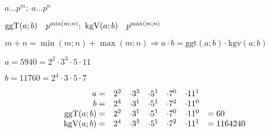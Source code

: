 $a \dots p^m;\ a \dots p^n$

$\ggt(a;b)\quad p^{\min(m;n)};\ \kgv(a;b)\quad p^{\max(m;n)}$

$m + n = \min(m;n) + \max(m;n) \Rightarrow a \cdot b = \textrm{ggt}(a;b) \cdot \textrm{kgv}(a;b)$

$a = 5940 = 2^2 \cdot 3^3 \cdot 5 \cdot 11$

$b = 11760 = 2^4 \cdot 3 \cdot 5 \cdot 7$

$$\begin{array}{rcccccl}
        a = & 2^2 & \cdot 3^3 & \cdot 5^1 & \cdot 7^0 & \cdot 11^1 \\
        b = & 2^4 & \cdot 3^1 & \cdot 5^1 & \cdot 7^2 & \cdot 11^0 \\
        \operatorname{ggT}(a;b) = & 2^2 & \cdot 3^1 & \cdot 5^1 & \cdot 7^0 & \cdot 11^0 & = 60      \\
        \operatorname{kgV}(a;b) = & 2^4 & \cdot 3^3 & \cdot 5^1 & \cdot 7^2 & \cdot 11^1 & = 1164240
\end{array}$$
